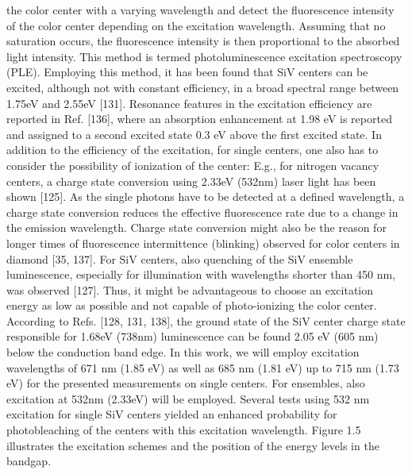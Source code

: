       the color center with a varying wavelength and detect the fluorescence intensity of the color center depending on the excitation wavelength. Assuming that no saturation occurs, the fluorescence intensity is then proportional to the absorbed light intensity. This method is termed photoluminescence excitation spectroscopy (PLE). Employing this method, it has been found that SiV centers can be excited, although not with constant efficiency, in a broad spectral range between 1.75eV and 2.55eV [131]. Resonance features in the excitation efficiency are reported in Ref. [136], where an absorption enhancement at 1.98 eV is reported and assigned to a second excited state 0.3 eV above the first excited state.
      In addition to the efficiency of the excitation, for single centers, one also has to consider the possibility of ionization of the center: E.g., for nitrogen vacancy centers, a charge state conversion using 2.33eV (532nm) laser light has been shown [125]. As the single photons have to be detected at a defined wavelength, a charge state conversion reduces the effective fluorescence rate due to a change in the emission wavelength. Charge state conversion might also be the reason for longer times of fluorescence intermittence (blinking) observed for color centers in diamond [35, 137]. For SiV centers, also quenching of the SiV ensemble luminescence, especially for illumination with wavelengths shorter than 450 nm, was observed [127]. Thus, it might be advantageous to choose an excitation energy as low as possible and not capable of photo-ionizing the color center. According to Refs. [128, 131, 138], the ground state of the SiV center charge state responsible for 1.68eV (738nm) luminescence can be found 2.05 eV (605 nm) below the conduction band edge. In this work, we will employ excitation wavelengths of 671 nm (1.85 eV) as well as 685 nm (1.81 eV) up to 715 nm (1.73 eV) for the presented measurements on single centers. For ensembles, also excitation at 532nm (2.33eV) will be employed. Several tests using 532 nm excitation for single SiV centers yielded an enhanced probability for photobleaching of the centers with this excitation wavelength. Figure 1.5 illustrates the excitation schemes and the position of the energy levels in the bandgap.

    \subsubsection{\zpl}

